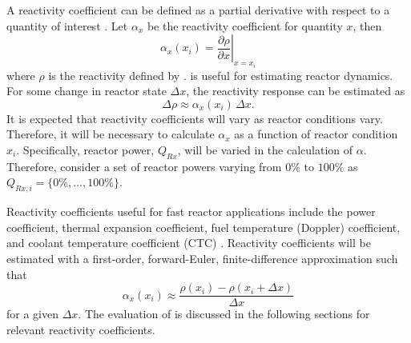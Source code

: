   A reactivity coefficient can be defined as a partial derivative with respect
  to a quantity of interest \cite{textbookknief}. Let $\alpha_x$ be the 
  reactivity coefficient for quantity $x$, then
  \begin{equation}
    \label{eq:reactivity_coefficient}
    \alpha_x(x_i) = \left. \frac{\partial \rho}{\partial x} \right|_{x=x_i}
  \end{equation}
  where $\rho$ is the reactivity defined by .
   is useful for estimating reactor dynamics.
  For some change in reactor state $\Delta x$, the reactivity response can be
  estimated as 
  \begin{equation}
    \label{eq:reactivity_estimate}
    \Delta \rho \approx \alpha_x(x_i) \, \Delta x.
  \end{equation}
  It is expected that reactivity coefficients will vary as reactor conditions
  vary. Therefore, it will be necessary to calculate $\alpha_x$ as a function of
  reactor condition $x_i$. Specifically, reactor power, $Q_{Rx}$, will be varied 
  in the calculation of $\alpha$. Therefore, consider a set of reactor powers
  varying from $0\%$ to $100\%$ as $Q_{Rx,i} = \{0\%,\ldots,100\%\}$.

  Reactivity coefficients useful for fast reactor applications include the power 
  coefficient, thermal expansion coefficient, fuel temperature (Doppler)
  coefficient, and coolant temperature coefficient (CTC) \cite{textbookknief}.
  Reactivity coefficients will be estimated with a first-order, forward-Euler,
  finite-difference approximation such that
  \begin{equation}
    \label{eq:reactivity_coefficient_finite_difference}
    \alpha_x(x_i) \approx \frac{\rho(x_i) - \rho(x_i + \Delta x)}{\Delta x}
  \end{equation}
  for a given $\Delta x$. The evaluation of
   is discussed in the
  following sections for relevant reactivity coefficients.

